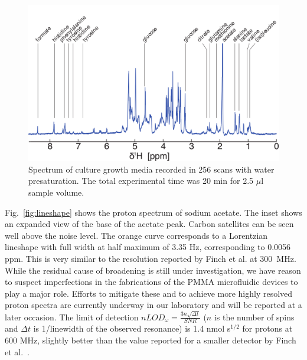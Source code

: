 \documentclass[preprint,5p]{elsarticle}
\newcommand{\fig}[1]{Fig.~\ref{#1}}
\begin{document}
\begin{figure}
\centering
\includegraphics[width=\linewidth,keepaspectratio=true]{./figures/media-180125-005-bigger-font.png}
\caption{Spectrum of culture growth media recorded in 256 scans with water presaturation. The total experimental time was 20 min for 2.5 $\mu$l sample volume.}
\label{fig:media-spec}
\end{figure}
\cbdelete
\fig{fig:lineshape} shows the proton spectrum of sodium acetate. The inset shows an expanded view of the base of the acetate peak. Carbon satellites can be seen well above the noise level. The orange curve
corresponds to a Lorentzian lineshape with full width at half maximum of 3.35
Hz, corresponding to 0.0056 ppm. This is very similar to the resolution reported
by Finch et al. at 300~MHz. While the residual cause of broadening is still
under investigation, we have reason to suspect imperfections in the fabrications
of the PMMA microfluidic devices to play a major role. Efforts to mitigate these
and to achieve more highly resolved proton spectra are currently underway in our
laboratory and will be reported at a later occasion.  The limit of detection
$nLOD_{\omega}=\frac{3n\sqrt{{\Delta}t}}{SNR}$ ($n$ is the number of spins and
$\Delta t$ is 1/linewidth of the observed resonance) is 1.4 nmol s$^{1/2}$ for
protons at 600 MHz, slightly better than the value reported for a smaller
detector by Finch et al.~\cite{gream_2016}.
\end{document}
